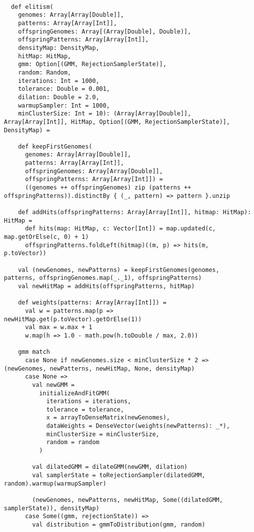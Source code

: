 \documentclass[10pt,a4paper]{article}
\theoremstyle{definition}
\theoremstyle{remark}
\begin{document}
\begin{lstlisting}[caption={Elitism function},label={lst:elitism}]

  def elitism(
    genomes: Array[Array[Double]],
    patterns: Array[Array[Int]],
    offspringGenomes: Array[(Array[Double], Double)],
    offspringPatterns: Array[Array[Int]],
    densityMap: DensityMap,
    hitMap: HitMap,
    gmm: Option[(GMM, RejectionSamplerState)],
    random: Random,
    iterations: Int = 1000,
    tolerance: Double = 0.001,
    dilation: Double = 2.0,
    warmupSampler: Int = 1000,
    minClusterSize: Int = 10): (Array[Array[Double]], Array[Array[Int]], HitMap, Option[(GMM, RejectionSamplerState)], DensityMap) =

    def keepFirstGenomes(
      genomes: Array[Array[Double]],
      patterns: Array[Array[Int]],
      offspringGenomes: Array[Array[Double]],
      offspringPatterns: Array[Array[Int]]) =
      ((genomes ++ offspringGenomes) zip (patterns ++ offspringPatterns)).distinctBy { (_, pattern) => pattern }.unzip

    def addHits(offspringPatterns: Array[Array[Int]], hitmap: HitMap): HitMap =
      def hits(map: HitMap, c: Vector[Int]) = map.updated(c, map.getOrElse(c, 0) + 1)
      offspringPatterns.foldLeft(hitmap)((m, p) => hits(m, p.toVector))

    val (newGenomes, newPatterns) = keepFirstGenomes(genomes, patterns, offspringGenomes.map(_._1), offspringPatterns)
    val newHitMap = addHits(offspringPatterns, hitMap)

    def weights(patterns: Array[Array[Int]]) =
      val w = patterns.map(p => newHitMap.get(p.toVector).getOrElse(1))
      val max = w.max + 1
      w.map(h => 1.0 - math.pow(h.toDouble / max, 2.0))

    gmm match
      case None if newGenomes.size < minClusterSize * 2 => (newGenomes, newPatterns, newHitMap, None, densityMap)
      case None =>
        val newGMM =
          initializeAndFitGMM(
            iterations = iterations,
            tolerance = tolerance,
            x = arrayToDenseMatrix(newGenomes),
            dataWeights = DenseVector(weights(newPatterns): _*),
            minClusterSize = minClusterSize,
            random = random
          )

        val dilatedGMM = dilateGMM(newGMM, dilation)
        val samplerState = toRejectionSampler(dilatedGMM, random).warmup(warmupSampler)

        (newGenomes, newPatterns, newHitMap, Some((dilatedGMM, samplerState)), densityMap)
      case Some((gmm, rejectionState)) =>
        val distribution = gmmToDistribution(gmm, random)


\end{lstlisting}
\end{document}
